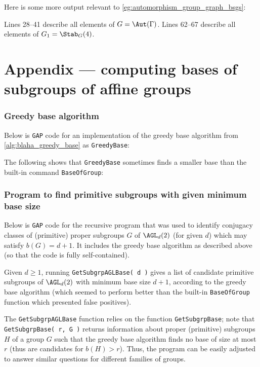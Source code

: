 Here is some more output relevant to \autoref{eg:automorphism_group_graph_bsgs}:\label{app:automorphism_group_graph_bsgs}



Lines 28--41 describe all elements of $G = \Aut(\Gamma)$. Lines 62--67 describe all elements of $G_1 = \Stab_G(4)$.

\chapter{Appendix --- computing bases of subgroups of affine groups}%

\subsection{Greedy base algorithm}

Below is \texttt{GAP} code for an implementation of the greedy base algorithm from \autoref{alg:blaha_greedy_base} as \texttt{GreedyBase}:\label{app:greedy_base}



The following shows that \texttt{GreedyBase} sometimes finds a smaller base than the built-in command \texttt{BaseOfGroup}:\label{app:greedy_better_than_default}



\subsection{Program to find primitive subgroups with given minimum base size}

Below is \texttt{GAP} code for the recursive program that was used to identify conjugacy classes of (primitive) proper subgroups $G$ of $\AGL_d(2)$ (for given $d$) which may satisfy $b(G) = d + 1$. It includes the greedy base algorithm as described above (so that the code is fully self-contained).

Given $d \geq 1$, running \texttt{GetSubgrpAGLBase( d )} gives a list of candidate primitive subgroups of $\AGL_d(2)$ with minimum base size $d + 1$, according to the greedy base algorithm (which seemed to perform better than the built-in \texttt{BaseOfGroup} function which presented false positives).

The \texttt{GetSubgrpAGLBase} function relies on the function \texttt{GetSubgrpBase}; note that \texttt{GetSubgrpBase( r, G )} returns information about proper (primitive) subgroups $H$ of a group $G$ such that the greedy base algorithm finds no base of size at most $r$ (thus are candidates for $b(H) > r$). Thus, the program can be easily adjusted to answer similar questions for different families of groups.\label{app:subgrps_base_len}

